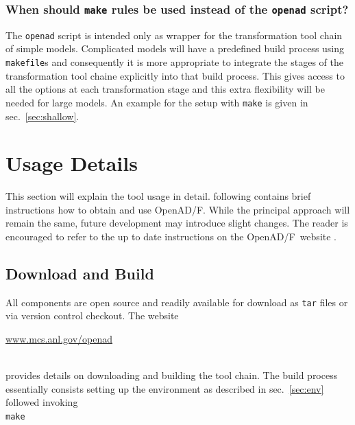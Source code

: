 \documentclass{book}
\newcommand{\OpenADF}{OpenAD/F}
\newcommand{\refsec}[1]{{sec.~\ref{#1}}}
\begin{document}
\subsection{When should {\tt make} rules be used instead of the {\tt openad} script?}\label{sec:useMake}
The \lstinline{openad} script is intended only as wrapper for the transformation tool chain of simple models. 
Complicated models will have a predefined build process using \lstinline{makefile}s and consequently 
it is more appropriate to integrate the stages of the transformation tool chaine explicitly into that
build process. 
This gives access to all the options at each transformation stage and this extra flexibility 
will be needed for large models. An example for the setup with \lstinline{make} is given in \refsec{sec:shallow}.    


\chapter{Usage Details} \label{sec:Usage}
This section will explain the tool usage in detail.  following contains brief instructions how to obtain and use \OpenADF. 
While the principal approach will remain the same, future development may 
introduce slight changes. The reader is encouraged to refer to the 
up to date instructions on the \OpenADF\ website \cite{openadWeb}.

\section{Download and Build}\label{sec:dab}
All components are open source and readily available for download as \lstinline{tar} files
or via version control checkout. 
The website\\[1ex] 
\centerline{\url{www.mcs.anl.gov/openad}}\\[1ex]
provides details on downloading and building the tool chain. 
The build process essentially consists setting up the environment as described in 
\refsec{sec:env} followed invoking\\[1ex]   
\hspace*{.3cm}\lstinline{make} \\[1ex] 

\end{document}

